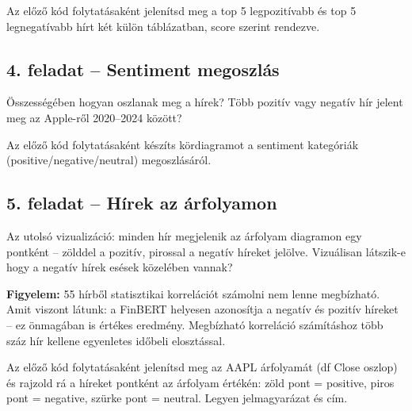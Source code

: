 \documentclass[11pt,a4paper]{article}
\newcommand{\warn}[1]{%
  \vspace{3pt}%
  \begin{tcolorbox}[warnstyle]%
  \textbf{\textcolor{warnborder}{Figyelem:}} #1%
  \end{tcolorbox}\vspace{2pt}}
\newcommand{\lbl}[1]{\vspace{6pt}\noindent{\small\bfseries\textcolor{labelcolor}{#1}}\par\smallskip}
\begin{document}
\bigskip

\lbl{Feladat:}

\begin{prompt}
Az előző kód folytatásaként jelenítsd meg a top 5 legpozitívabb
és top 5 legnegatívabb hírt két külön táblázatban, score szerint rendezve.
\end{prompt}

\bigskip

\subsection{4. feladat -- Sentiment megoszlás}

\noindent Összességében hogyan oszlanak meg a hírek?
Több pozitív vagy negatív hír jelent meg az Apple-ről 2020--2024 között?

\bigskip

\lbl{Feladat:}

\begin{prompt}
Az előző kód folytatásaként készíts kördiagramot
a sentiment kategóriák (positive/negative/neutral) megoszlásáról.
\end{prompt}

\bigskip

\subsection{5. feladat -- Hírek az árfolyamon}

\noindent Az utolsó vizualizáció: minden hír megjelenik az árfolyam
diagramon egy pontként -- zölddel a pozitív, pirossal a negatív híreket jelölve.
Vizuálisan látszik-e hogy a negatív hírek esések közelében vannak?

\warn{55 hírből statisztikai korrelációt számolni nem lenne megbízható.
Amit viszont látunk: a FinBERT helyesen azonosítja a negatív és pozitív híreket --
ez önmagában is értékes eredmény. Megbízható korreláció számításhoz
több száz hír kellene egyenletes időbeli elosztással.}

\bigskip

\lbl{Feladat:}

\begin{prompt}
Az előző kód folytatásaként jelenítsd meg az AAPL árfolyamát (df Close oszlop)
és rajzold rá a híreket pontként az árfolyam értékén:
zöld pont = positive, piros pont = negative, szürke pont = neutral.
Legyen jelmagyarázat és cím.
\end{prompt}
\end{document}

